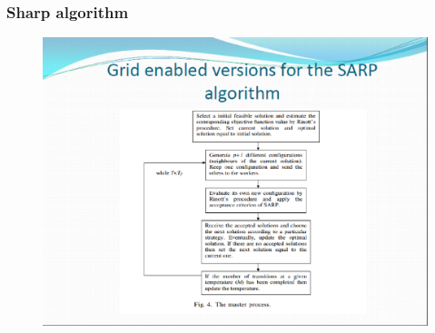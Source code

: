 \documentclass{beamer}
\begin{document}
\begin{frame}
\frametitle{Sharp algorithm }
\begin{figure}[!th]
\begin{center}
\includegraphics[width=1\textwidth]{img/pic9.eps}
\end{center}
\end{figure}
\end{frame}
\end{document}
